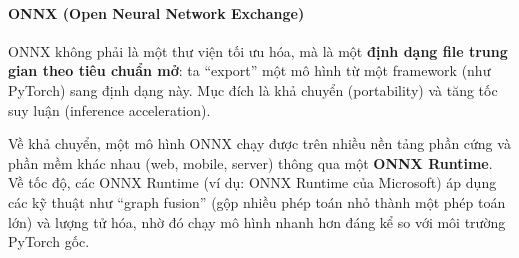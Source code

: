 \paragraph{ONNX (Open Neural Network Exchange)}
ONNX không phải là một thư viện tối ưu hóa, mà là một \textbf{định dạng file trung gian theo tiêu chuẩn mở}: ta “export” một mô hình từ một framework (như PyTorch) sang định dạng này. Mục đích là khả chuyển (portability) và tăng tốc suy luận (inference acceleration).

Về khả chuyển, một mô hình ONNX chạy được trên nhiều nền tảng phần cứng và phần mềm khác nhau (web, mobile, server) thông qua một \textbf{ONNX Runtime}. Về tốc độ, các ONNX Runtime (ví dụ: ONNX Runtime của Microsoft) áp dụng các kỹ thuật như “graph fusion” (gộp nhiều phép toán nhỏ thành một phép toán lớn) và lượng tử hóa, nhờ đó chạy mô hình nhanh hơn đáng kể so với môi trường PyTorch gốc.